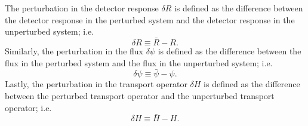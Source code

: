 The perturbation in the detector response $\delta R$ is defined as the difference between the detector response in the perturbed system and the detector response in the unperturbed system; i.e.
\begin{equation}\label{eq:bg:pt:delta_r}
  \delta R \equiv \bar{R} - R.
\end{equation}
Similarly, the perturbation in the flux $\delta\psi$ is defined as the difference between the flux in the perturbed system and the flux in the unperturbed system; i.e.
\begin{equation}\label{eq:bg:pt:delta_psi}
  \delta \psi \equiv \bar{\psi} - \psi.
\end{equation}
Lastly, the perturbation in the transport operator $\delta H$ is defined as the difference between the perturbed transport operator and the unperturbed transport operator; i.e.
\begin{equation}\label{eq:bg:pt:delta_H}
  \delta H \equiv \bar{H} - H.
\end{equation}

